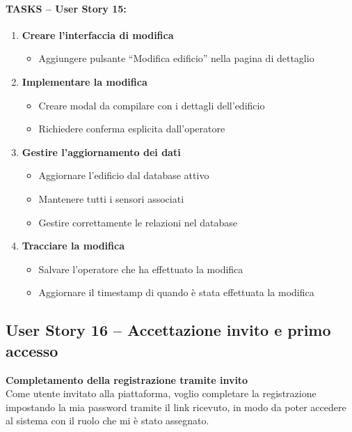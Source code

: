 \paragraph*{TASKS – User Story 15:}
\begin{enumerate}
    \item \textbf{Creare l'interfaccia di modifica}
    \begin{itemize}
        \item Aggiungere pulsante ``Modifica edificio'' nella pagina di dettaglio
    \end{itemize}
    \item \textbf{Implementare la modifica}
    \begin{itemize}
        \item Creare modal da compilare con i dettagli dell'edificio
        \item Richiedere conferma esplicita dall'operatore
    \end{itemize}
    \item \textbf{Gestire l'aggiornamento dei dati}
    \begin{itemize}
        \item Aggiornare l'edificio dal database attivo
        \item Mantenere tutti i sensori associati
        \item Gestire correttamente le relazioni nel database
    \end{itemize}
    \item \textbf{Tracciare la modifica}
    \begin{itemize}
        \item Salvare l'operatore che ha effettuato la modifica
        \item Aggiornare il timestamp di quando è stata effettuata la modifica
    \end{itemize}
\end{enumerate}

\subsection{User Story 16 – Accettazione invito e primo accesso}
\label{us:accettazioneInvito}

\textbf{Completamento della registrazione tramite invito} \\
Come utente invitato alla piattaforma, voglio completare la registrazione impostando la mia password tramite il link ricevuto, in modo da poter accedere al sistema con il ruolo che mi è stato assegnato.

